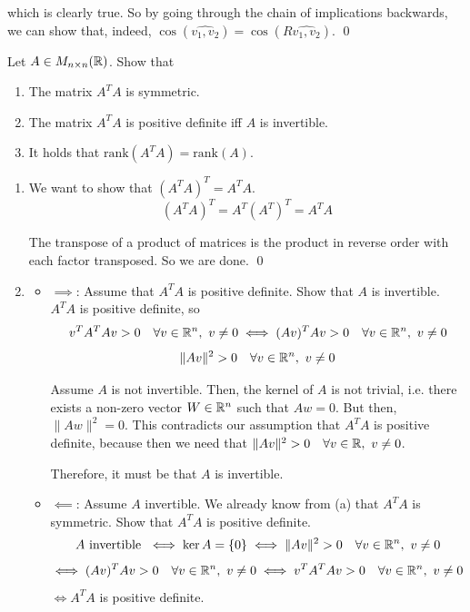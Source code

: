 \documentclass[12pt]{article}
\begin{document}
which is clearly true. So by going through the chain of implications backwards, we can show that, indeed, $\cos(\widehat{v_1, v_2}) = \cos(R \widehat{v_1, v_2})$. \qed

\begin{problem}{}{}
    Let $A \in M_{n \times n}(\mathbb{R})$. Show that
    \begin{enumerate}[label=\alph*)]
        \item The matrix $A^T A$ is symmetric.
        \item The matrix $A^T A$ is positive definite iff $A$ is invertible.
        \item It holds that $\mathrm{rank}(A^T A) = \mathrm{rank}(A)$.
    \end{enumerate}
\end{problem}

\begin{enumerate}[label=\alph*)]
    \item We want to show that $(A^T A)^T = A^T A$.
    $$
        (A^T A)^T = A^T(A^T)^T = A^T A
    $$

    The transpose of a product of matrices is the product in reverse order with each factor transposed. So we are done. \qed
    \item 
        \begin{itemize}
            \item \underline{$\implies$}: Assume that $A^T A$ is positive definite. Show that $A$ is invertible.
            $A^T A $ is positive definite, so 
            $$
                v^T A^T A v > 0 \quad \forall v \in \mathbb{R}^n,\ v \neq 0 \iff (A v)^T A v > 0 \quad \forall v \in \mathbb{R}^n,\ v \neq 0
            $$
            $$
                \lVert A v \rVert^2 > 0 \quad \forall v \in \mathbb{R}^n,\ v \neq 0
            $$

            Assume $A$ is not invertible. Then, the kernel of $A$ is not trivial, i.e. there exists a non-zero vector $W \in \mathbb{R}^n$ such that $Aw = 0$. But then, $\lVert Aw \rVert^2 = 0$. This contradicts our assumption that $A^T A$ is positive definite, because then we need that $\lVert A v \rVert^2 > 0 \quad \forall v \in \R,\ v \neq 0$.

            Therefore, it must be that $A$ is invertible.
            
            \item \underline{$\impliedby$}: Assume $A$ invertible. We already know from (a) that $A^T A$ is symmetric. Show that $A^T A$ is positive definite.
            $$
                A \text{ invertible } \iff \ker A = \{0\} \iff \lVert A v \rVert^2 > 0 \quad \forall v \in \mathbb{R}^n,\ v \neq 0
            $$
            $$
                \iff (A v)^T A v > 0 \quad \forall v \in \mathbb{R}^n,\ v \neq 0 \iff v^T A^T A v > 0 \quad \forall v \in \mathbb{R}^n,\ v \neq 0 
            $$
            $\iff A^T A$ is positive definite.
        \end{itemize}


\end{enumerate}
\end{document}
